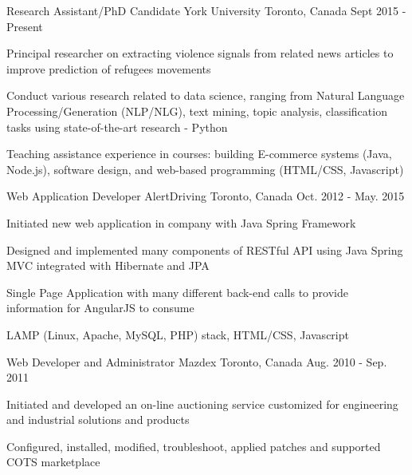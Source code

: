 \begin{cventries}
  \cventry
    {Research Assistant/PhD Candidate}
    {York University}
    {Toronto, Canada}
    {Sept 2015 - Present}
    {
      \begin{cvitems}
    \item{Principal researcher on extracting violence signals from related news articles to improve prediction of refugees movements}
      	\item{Conduct various research related to data science, ranging from Natural Language Processing/Generation (NLP/NLG), text mining, topic analysis, classification tasks using state-of-the-art research - Python}
        \item{Teaching assistance experience in courses: building E-commerce systems (Java, Node.js), software design, and web-based programming (HTML/CSS, Javascript)}
      \end{cvitems}
    }
    


  \cventry
    {Web Application Developer}
    {AlertDriving}
    {Toronto, Canada}
    {Oct. 2012 - May. 2015}
    {
      \begin{cvitems}
        \item{Initiated new web application in company with Java Spring Framework }
        \item{Designed and implemented many components of RESTful API using Java Spring MVC integrated with Hibernate and JPA}
        \item{Single Page Application with many different back-end calls to provide information for AngularJS to consume}
        \item {LAMP (Linux, Apache, MySQL, PHP) stack, HTML/CSS, Javascript}
      \end{cvitems}
    }
    
    \cventry
    {Web Developer and Administrator}
    {Mazdex}
    {Toronto, Canada}
    {Aug. 2010 - Sep. 2011}
    {
      \begin{cvitems}
        \item{Initiated and developed an on-line auctioning service customized for engineering and industrial solutions and products}
        \item{Configured, installed, modified, troubleshoot, applied patches and supported COTS marketplace}
      \end{cvitems}
    }
    
\vspace{-1em}


\end{cventries}
